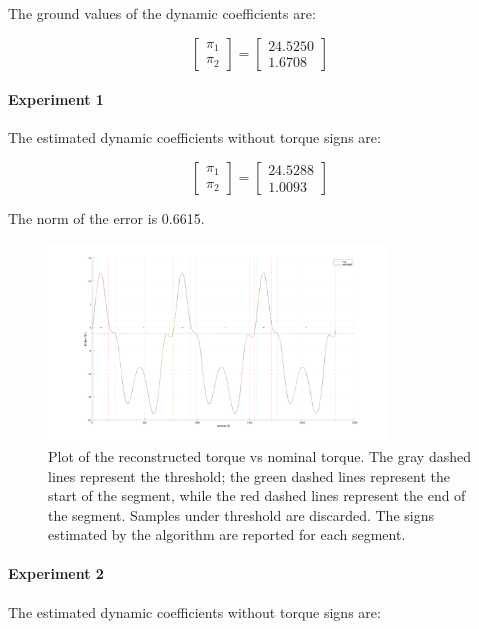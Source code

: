\documentclass{article}
\begin{document}
The ground values of the dynamic coefficients are:

\[\begin{bmatrix}
\pi_1 \\ \pi_2
\end{bmatrix}=\begin{bmatrix}
24.5250 \\ 1.6708
\end{bmatrix}\]

\paragraph{Experiment 1} The estimated dynamic coefficients without torque signs are:

\[\begin{bmatrix}
\pi_1  \\ \pi_2 
\end{bmatrix}=\begin{bmatrix}
24.5288 \\ 1.0093
\end{bmatrix}\]

The norm of the error is 0.6615.

\begin{figure}[!htbp]
\centering
\includegraphics[width=0.8\textwidth]{images/1-dof/results_experiment1.png}
\caption{Plot of the reconstructed torque vs nominal torque. The gray dashed lines represent the threshold; the green dashed lines represent the start of the segment, while the red dashed lines represent the end of the segment. Samples under threshold are discarded. The signs estimated by the algorithm are reported for each segment.}
\end{figure}
\FloatBarrier

\paragraph{Experiment 2} The estimated dynamic coefficients without torque signs are:
\end{document}
